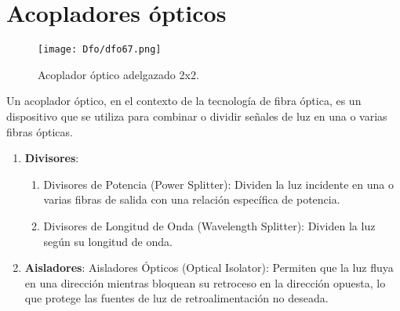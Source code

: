\documentclass[
	12pt, %
	fleqn, %
	a4paper, %
	oneside, %
]{LegrandOrangeBook}
\begin{document}
\section{Acopladores ópticos}
\begin{figure}[H]
\centering
\texttt{[image: Dfo/dfo67.png]}
\caption{Acoplador óptico adelgazado 2x2.}
\label{fig:acoplador optico}
\end{figure}
Un acoplador óptico, en el contexto de la tecnología de fibra óptica, es un dispositivo que se utiliza para combinar o dividir señales de luz en una o varias fibras ópticas.
\begin{enumerate}

\item \textbf{Divisores}:
\begin{enumerate}
\item Divisores de Potencia (Power Splitter): Dividen la luz incidente en una o varias fibras de salida con una relación específica de potencia.
\item Divisores de Longitud de Onda (Wavelength Splitter): Dividen la luz según su longitud de onda.
\end{enumerate}

\item \textbf{Aisladores}: Aisladores Ópticos (Optical Isolator): Permiten que la luz fluya en una dirección mientras bloquean su retroceso en la dirección opuesta, lo que protege las fuentes de luz de retroalimentación no deseada.



\end{enumerate}
\end{document}
